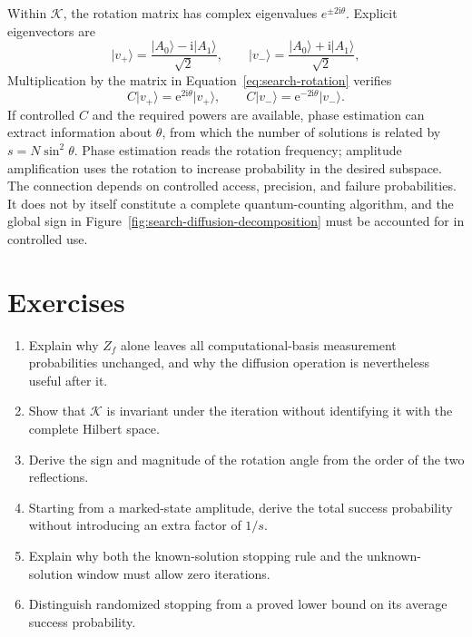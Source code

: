 \documentclass[11pt,oneside,openany]{book}
\providecommand{\ket}{}
\renewcommand{\ket}[1]{\lvert #1\rangle}
\newcommand{\ii}{\mathrm{i}}
\theoremstyle{definition}
\begin{document}
Within $\mathcal K$, the rotation matrix has complex eigenvalues $e^{\pm2\ii\theta}$. Explicit eigenvectors are
\begin{equation}
 \ket{v_+}=\frac{\ket{A_0}-\ii\ket{A_1}}{\sqrt2},\qquad
 \ket{v_-}=\frac{\ket{A_0}+\ii\ket{A_1}}{\sqrt2},
\end{equation}
Multiplication by the matrix in Equation~\eqref{eq:search-rotation} verifies
\begin{equation}
 C\ket{v_+}=\mathrm e^{2\ii\theta}\ket{v_+},\qquad
 C\ket{v_-}=\mathrm e^{-2\ii\theta}\ket{v_-}.
\end{equation}
If controlled $C$ and the required powers are available, phase estimation can extract information about $\theta$, from which the number of solutions is related by $s=N\sin^2\theta$. Phase estimation reads the rotation frequency; amplitude amplification uses the rotation to increase probability in the desired subspace. The connection depends on controlled access, precision, and failure probabilities. It does not by itself constitute a complete quantum-counting algorithm, and the global sign in Figure~\ref{fig:search-diffusion-decomposition} must be accounted for in controlled use.

\section*{Exercises}
\begin{enumerate}
 \item Explain why $Z_f$ alone leaves all computational-basis measurement probabilities unchanged, and why the diffusion operation is nevertheless useful after it.
 \item Show that $\mathcal K$ is invariant under the iteration without identifying it with the complete Hilbert space.
 \item Derive the sign and magnitude of the rotation angle from the order of the two reflections.
 \item Starting from a marked-state amplitude, derive the total success probability without introducing an extra factor of $1/s$.
 \item Explain why both the known-solution stopping rule and the unknown-solution window must allow zero iterations.
 \item Distinguish randomized stopping from a proved lower bound on its average success probability.
\end{enumerate}
\end{document}
